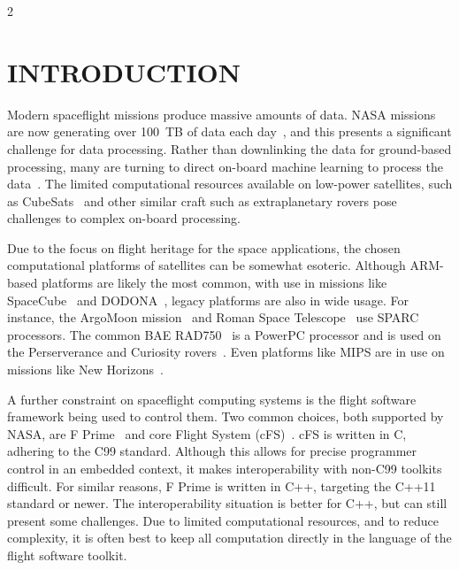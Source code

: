 \documentclass[10pt, fleqn]{article}
\begin{document}
\begin{multicols*}{2}

\section{INTRODUCTION}

Modern spaceflight missions
produce massive amounts of data.
NASA missions are now generating over 100~TB of data each day~\cite{lee2021nasa},
and this presents a significant challenge for data processing.
Rather than downlinking the data for ground-based processing, many are turning to 
direct on-board machine learning
to process the data~\cite{henriquez2016high, habib2022artificial, cody2017application}.
The limited computational resources available on
low-power satellites, such as CubeSats~\cite{poghosyan2017cubesat}
and other similar craft such as extraplanetary rovers
pose challenges to complex on-board processing.

Due to the focus on flight heritage for the space applications,
the chosen computational platforms of satellites can be somewhat esoteric.
Although ARM-based platforms are likely the most common,
with use in missions like SpaceCube~\cite{brewer2020nasa} and DODONA~\cite{mae2022dorbit},
legacy platforms are also in wide usage.
For instance, the ArgoMoon mission~\cite{lombardo2022design}
and Roman Space Telescope~\cite{goodwill2021nasa} use SPARC processors.
The common BAE RAD750~\cite{berger2001rad750} is a PowerPC processor and
is used on the Perserverance and Curiosity rovers~\cite{goodwill2021nasa}.
Even platforms like MIPS are in use on missions like New Horizons~\cite{kusnierkiewicz2005description}.

A further constraint on spaceflight computing systems is
the flight software framework being used to control them.
Two common choices,
both supported by NASA,
are F Prime~\cite{bocchino2018f}
and core Flight System (cFS)~\cite{mccomas2012nasa}.
cFS is written in C,
adhering to the C99 standard.
Although this allows for precise programmer control in an embedded context,
it makes interoperability with non-C99 toolkits difficult.
For similar reasons, F Prime is written in C++,
targeting the C++11 standard or newer.
The interoperability situation is better for C++,
but can still present some challenges.
Due to limited computational resources, and to reduce complexity,
it is often best to keep all computation directly in the language of the flight software toolkit.


\end{multicols*}
\end{document}
